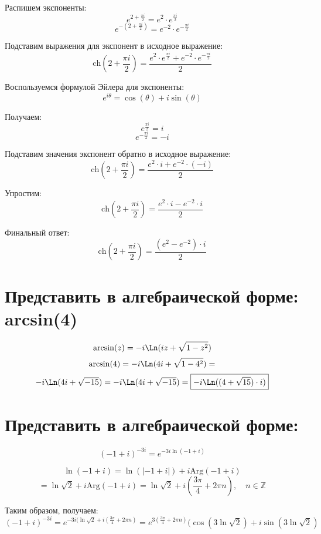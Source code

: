 \documentclass{article}
\begin{document}
	Распишем экспоненты:
	\[
		e^{2 + \frac{\pi i}{2}}= e^{2} \cdot e^{\frac{\pi i}{2}}
	\]
	\[
		e^{-(2 + \frac{\pi i}{2})}= e^{-2}\cdot e^{-\frac{\pi i}{2}}
	\]

	Подставим выражения для экспонент в исходное выражение:
	\[
		\text{ch}(2 + \frac{\pi i}{2}) = \frac{e^{2} \cdot e^{\frac{\pi i}{2}}+ e^{-2}\cdot
		e^{-\frac{\pi i}{2}}}{2}
	\]

	Воспользуемся формулой Эйлера для экспоненты:
	\[
		e^{i\theta}= \cos(\theta) + i\sin(\theta)
	\]

	Получаем:
	\[
		e^{\frac{\pi i}{2}}= i
	\]
	\[
		e^{-\frac{\pi i}{2}}= -i
	\]

	Подставим значения экспонент обратно в исходное выражение:
	\[
		\text{ch}(2 + \frac{\pi i}{2}) = \frac{e^{2} \cdot i + e^{-2}\cdot (-i)}{2}
	\]

	Упростим:
	\[
		\text{ch}(2 + \frac{\pi i}{2}) = \frac{e^{2} \cdot i - e^{-2}\cdot i}{2}
	\]

	Финальный ответ:
	\[
		\boxed{\text{ch}(2 + \frac{\pi i}{2}) = \frac{(e^{2} - e^{-2}) \cdot i}{2}}
	\]

	\vspace{1cm}


	\section{Представить в алгебраической форме: arcsin(4)}
	\vspace{0.5cm}
	\[
		\arcsin(z) = -i \Ln(iz + \sqrt{1 - z^{2}})
	\]
	\[
		\arcsin(4) = -i \Ln(4i + \sqrt{1 - 4^{2}}) =
	\]
	\[
		-i \Ln(4i + \sqrt{-15}) = -i \Ln(4i + \sqrt{-15}) = \boxed{ -i \Ln((4 + \sqrt{15}) \cdot i) }
	\]

	\vspace{0.5cm}

	\section{Представить в алгебраической форме: }
	\[
		(-1 + i)^{-3i}= e^{-3i\ln(-1 + i)}
	\]

	\[
		\ln(-1 + i) = \ln(|-1 + i|) + i \text{Arg}(-1 + i)
	\]
	\[
		= \ln\sqrt{2}+ i \text{Arg}(-1 + i) = \ln\sqrt{2}+ i \left( \frac{3\pi}{4}+ 2
		\pi n \right), \quad n \in \mathbb{Z}
	\]

	Таким образом, получаем: \\
	\[
		(-1 + i)^{-3i}= e^{-3i(\ln\sqrt{2} + i ( \frac{3\pi}{4} + 2\pi n) }= e^{3(\frac{3\pi}{4}
		+ 2\pi n)}(\cos(3\ln{\sqrt{2}}) + i\sin(3\ln{\sqrt{2}})
	\]
\end{document}
